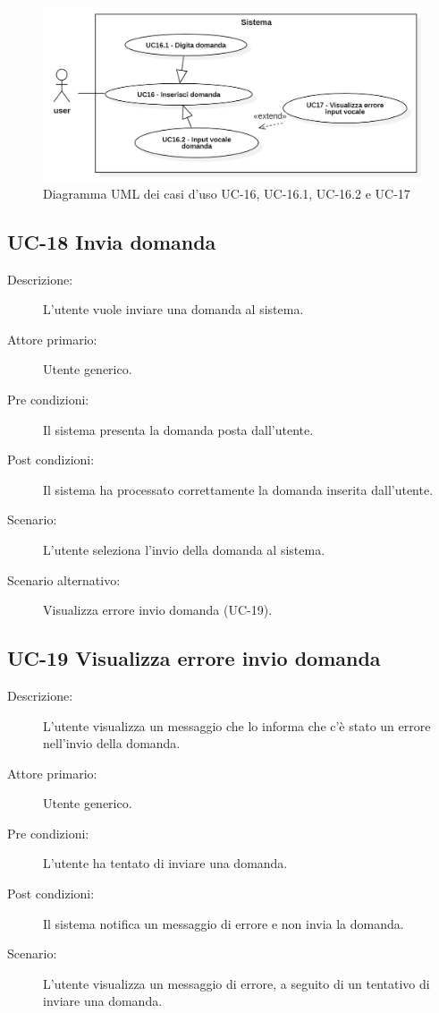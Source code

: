 \begin{figure}[H]
    \centering
    \includegraphics[width=\linewidth]{UC16-17.PNG}
    \caption{Diagramma UML dei casi d'uso UC-16, UC-16.1, UC-16.2 e UC-17}
    \label{fig:UC16-17}
\end{figure}

\subsection{UC-18 Invia domanda}
\begin{description}
    \item[Descrizione:] L'utente vuole inviare una domanda al sistema.
    \item[Attore primario:] Utente generico.
    \item[Pre condizioni:] Il sistema presenta la domanda posta dall'utente.
    \item[Post condizioni:] Il sistema ha processato correttamente la domanda inserita dall'utente.
    \item[Scenario:] L'utente seleziona l'invio della domanda al sistema.
    \item[Scenario alternativo:] Visualizza errore invio domanda (UC-19).
\end{description}

\subsection{UC-19 Visualizza errore invio domanda}
\begin{description}
    \item[Descrizione:] L'utente visualizza un messaggio che lo informa che c'è stato un errore nell'invio della domanda.
    \item[Attore primario:] Utente generico.
    \item[Pre condizioni:] L'utente ha tentato di inviare una domanda.
    \item[Post condizioni:] Il sistema notifica un messaggio di errore e non invia la domanda.
    \item[Scenario:] L'utente visualizza un messaggio di errore, a seguito di un tentativo di inviare una domanda.
\end{description}

